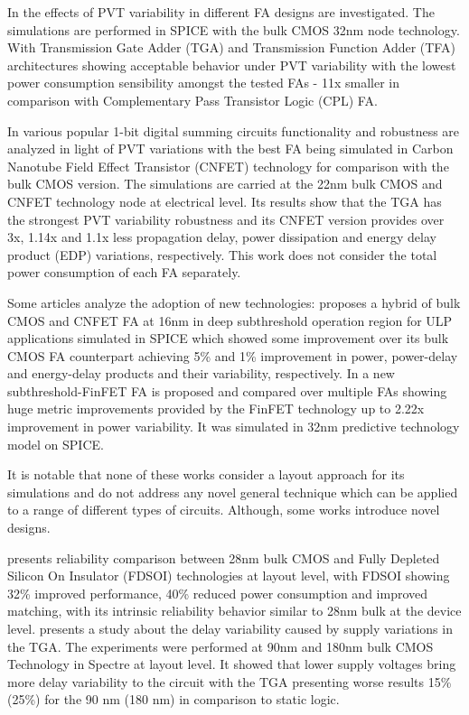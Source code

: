 \documentclass[pgmicro,mestrado,english]{iiufrgs}
\begin{document}
In \cite{ames2016investigating} the effects of PVT variability in different FA designs are investigated. The simulations are performed in SPICE with the bulk CMOS 32nm node technology. With Transmission Gate Adder (TGA) and Transmission Function Adder (TFA) architectures showing acceptable behavior under PVT variability with the lowest power consumption sensibility amongst the tested FAs - 11x smaller in comparison with Complementary Pass Transistor Logic (CPL) FA.

In \cite{islam2011design} various popular 1-bit digital summing circuits functionality and robustness are analyzed in light of PVT variations with the best FA being simulated in Carbon Nanotube Field Effect Transistor (CNFET) technology for comparison with the bulk CMOS version. The simulations are carried at the 22nm bulk CMOS and CNFET technology node at electrical level. Its results show that the TGA has the strongest PVT variability robustness and its CNFET version provides over 3x, 1.14x and 1.1x less propagation delay, power dissipation and energy delay product (EDP) variations, respectively. This work does not consider the total power consumption of each FA separately.

Some articles analyze the adoption of new technologies: \cite{guduri2015design} proposes a hybrid of bulk CMOS and CNFET FA at 16nm in deep subthreshold operation region for ULP applications simulated in SPICE which showed some improvement over its bulk CMOS FA counterpart achieving 5\% and 1\% improvement in power, power-delay and energy-delay products and their variability, respectively. In \cite{islam2011variability} a new subthreshold-FinFET FA is proposed and compared over multiple FAs showing huge metric improvements provided by the FinFET technology up to 2.22x improvement in power variability. It was simulated in 32nm predictive technology model on SPICE.

It is notable that none of these works consider a layout approach for its simulations and do not address any novel general technique which can be applied to a range of different types of circuits. Although, some works introduce novel designs.

\cite{federspiel201228nm} presents reliability comparison between 28nm bulk CMOS and Fully Depleted Silicon On Insulator (FDSOI) technologies at layout level, with FDSOI showing 32\% improved performance, 40\% reduced power consumption and improved matching, with its intrinsic reliability behavior similar to 28nm bulk at the device level. \cite{alioto2007delay} presents a study about the delay variability caused by supply variations in the TGA. The experiments were performed at 90nm and 180nm bulk CMOS Technology in Spectre at layout level. It showed that lower supply voltages bring more delay variability to the circuit with the TGA presenting worse results 15\% (25\%) for the 90 nm (180 nm) in comparison to static logic.
\end{document}
